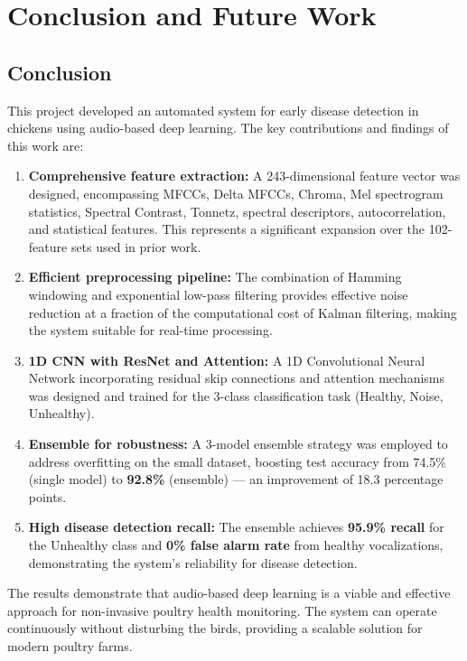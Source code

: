 \documentclass[12pt,a4paper]{report}
\begin{document}
\chapter{Conclusion and Future Work}
\label{ch:conclusion}

\section{Conclusion}

This project developed an automated system for early disease detection in chickens using audio-based deep learning. The key contributions and findings of this work are:

\begin{enumerate}
    \item \textbf{Comprehensive feature extraction:} A 243-dimensional feature vector was designed, encompassing MFCCs, Delta MFCCs, Chroma, Mel spectrogram statistics, Spectral Contrast, Tonnetz, spectral descriptors, autocorrelation, and statistical features. This represents a significant expansion over the 102-feature sets used in prior work.

    \item \textbf{Efficient preprocessing pipeline:} The combination of Hamming windowing and exponential low-pass filtering provides effective noise reduction at a fraction of the computational cost of Kalman filtering, making the system suitable for real-time processing.

    \item \textbf{1D CNN with ResNet and Attention:} A 1D Convolutional Neural Network incorporating residual skip connections and attention mechanisms was designed and trained for the 3-class classification task (Healthy, Noise, Unhealthy).

    \item \textbf{Ensemble for robustness:} A 3-model ensemble strategy was employed to address overfitting on the small dataset, boosting test accuracy from 74.5\% (single model) to \textbf{92.8\%} (ensemble) --- an improvement of 18.3 percentage points.

    \item \textbf{High disease detection recall:} The ensemble achieves \textbf{95.9\% recall} for the Unhealthy class and \textbf{0\% false alarm rate} from healthy vocalizations, demonstrating the system's reliability for disease detection.
\end{enumerate}

The results demonstrate that audio-based deep learning is a viable and effective approach for non-invasive poultry health monitoring. The system can operate continuously without disturbing the birds, providing a scalable solution for modern poultry farms.
\end{document}
